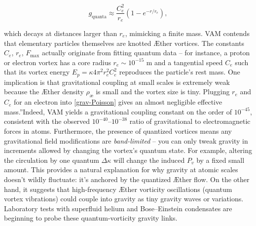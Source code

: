 \documentclass[a4paper,12pt]{article}
\begin{document}
\begin{equation}
    g_\text{quanta} \approx \frac{C_e^2}{r_e} \left(1 - e^{-r/r_e} \right),
    \label{eq:g_quanta}
\end{equation}

which decays at distances larger than $r_e$, mimicking a finite mass.
VAM contends that elementary particles themselves are knotted Æther vortices. The constants $C_e$, $r_e$, $F_{\max}$ actually originate from fitting quantum data – for instance, a proton or electron vortex has a core radius $r_e \sim 10^{-15}$ m and a tangential speed $C_e$ such that its vortex energy $E_p = \kappa 4\pi^2 r_e^2 C_e^2$ reproduces the particle's rest mass. One implication is that gravitational coupling at small scales is extremely weak because the Æther density $\rho_\text{\ae}$ is small and the vortex size is tiny. Plugging $r_e$ and $C_e$ for an electron into \eqref{grav-Poisson} gives an almost negligible effective \grqq mass.\textquotedblright Indeed, VAM yields a gravitational coupling constant on the order of $10^{-45}$, consistent with the observed $10^{-40}$–$10^{-38}$ ratio of gravitational to electromagnetic forces in atoms. Furthermore, the presence of quantized vortices means any gravitational field modifications are \textit{band-limited} – you can only tweak gravity in increments allowed by changing the vortex's quantum state. For example, altering the circulation by one quantum $\Delta \kappa$ will change the induced $P_v$ by a fixed small amount. This provides a natural explanation for why gravity at atomic scales doesn't wildly fluctuate: it's anchored by the quantized Æther flow. On the other hand, it suggests that high-frequency Æther vorticity oscillations (quantum vortex vibrations) could couple into gravity as tiny gravity waves or variations. Laboratory tests with superfluid helium and Bose–Einstein condensates are beginning to probe these quantum-vorticity gravity links.
\end{document}
